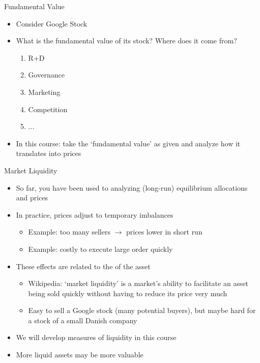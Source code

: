 \documentclass[english,10pt]{beamer}
\theoremstyle{definition}
\begin{document}
\begin{frame}[label=main4]{Fundamental Value}
\begin{itemize}
	\item Consider Google Stock
	\item What is the fundamental value of its stock? Where does it come from?
	\begin{enumerate}
		\item R+D
		\item Governance
		\item Marketing
		\item Competition
		\item ...
	\end{enumerate}
	\item In this course: take the `fundamental value' as given and analyze how it translates into prices
	
	\hyperlink{quote}{}
\end{itemize}
\end{frame}


\begin{frame}{Market Liquidity}
\begin{itemize}
	\item So far, you have been used to analyzing (long-run) equilibrium allocations and prices
	\item In practice, prices adjust to temporary imbalances
	\begin{itemize}
		\item Example: too many sellers $\rightarrow$ prices lower in short run
		\item Example: costly to execute large order quickly
	\end{itemize}
	\item These effects are related to the  of the asset
	\begin{itemize}
		\item Wikipedia: `market liquidity' is a market's ability to facilitate an asset being sold quickly without having to reduce its price very much
		\item Easy to sell a Google stock (many potential buyers), but maybe hard for a stock of a small Danish company
	\end{itemize}
	\item We will develop measures of liquidity in this course
	\item More liquid assets may be more valuable
\end{itemize}
\end{frame}
\end{document}
